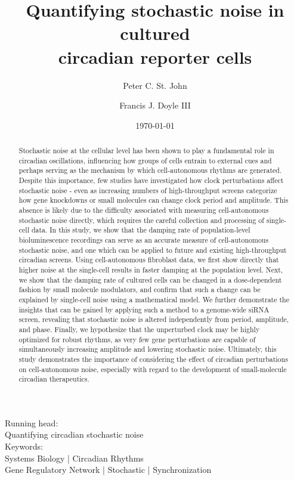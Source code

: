 \documentclass[11pt, letterpaper]{article}
\begin{document}
\title{Quantifying stochastic noise in cultured\\ circadian reporter cells}
\author[1]{Peter C. St. John}
\author[1,*]{Francis J. Doyle III}
\date{\today}
\maketitle

\begin{center}
Running head:\\ {Quantifying circadian stochastic noise} \\[1ex]
Keywords:\\ Systems Biology | Circadian Rhythms \\ Gene
Regulatory Network | Stochastic | Synchronization
\end{center}

\pagebreak
\begin{abstract}
Stochastic noise at the cellular level has been shown to play a fundamental role in circadian oscillations, influencing how groups of cells entrain to external cues and perhaps serving as the mechanism by which cell-autonomous rhythms are generated.
Despite this importance, few studies have investigated how clock perturbations affect stochastic noise - even as increasing numbers of high-throughput screens categorize how gene knockdowns or small molecules can change clock period and amplitude.
This absence is likely due to the difficulty associated with measuring cell-autonomous stochastic noise directly, which requires the careful collection and processing of single-cell data.
In this study, we show that the damping rate of population-level bioluminescence recordings can serve as an accurate measure of cell-autonomous stochastic noise, and one which can be applied to future and existing high-throughput circadian screens.
Using cell-autonomous fibroblast data, we first show directly that higher noise at the single-cell results in faster damping at the population level.
Next, we show that the damping rate of cultured cells can be changed in a dose-dependent fashion by small molecule modulators, and confirm that such a change can be explained by single-cell noise using a mathematical model.
We further demonstrate the insights that can be gained by applying such a method to a genome-wide siRNA screen, revealing that stochastic noise is altered independently from period, amplitude, and phase.
Finally, we hypothesize that the unperturbed clock may be highly optimized for robust rhythms, as very few gene perturbations are capable of simultaneously increasing amplitude and lowering stochastic noise.
Ultimately, this study demonstrates the importance of considering the effect of circadian perturbations on cell-autonomous noise, especially with regard to the development of small-molecule circadian therapeutics.
\end{abstract}
\end{document}

